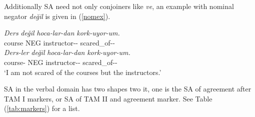 Additionally SA need not only conjoiners like \textit{ve}, an example with nominal negator \textit{değil} is given in (\ref{nomex}).

\begin{exe}
    \ex \label{nomex4}
    \begin{xlist}
        \ex
        \gll 
        \textit{Ders} \textit{değil} \textit{hoca-lar-dan} \textit{kork-uyor-um.} \\ course NEG instructor-{\Pl}-{\Abl} scared\_of-{\Prog}-{\First}{\Sg} \\

        \ex
        \gll 
        \textit{Ders-ler} \textit{değil} \textit{hoca-lar-dan} \textit{kork-uyor-um.} \\ course-{\Pl} NEG instructor-{\Pl}-{\Abl} scared\_of-{\Prog}-{\First}{\Sg} \\
        \glt `I am not scared of the courses but the instructors.'
    
    \end{xlist}

\end{exe}

SA in the verbal domain has two shapes two it, one is the SA of agreement after TAM I markers, or SA of TAM II and agreement marker. See Table (\ref{tab:markers}) for a list.

